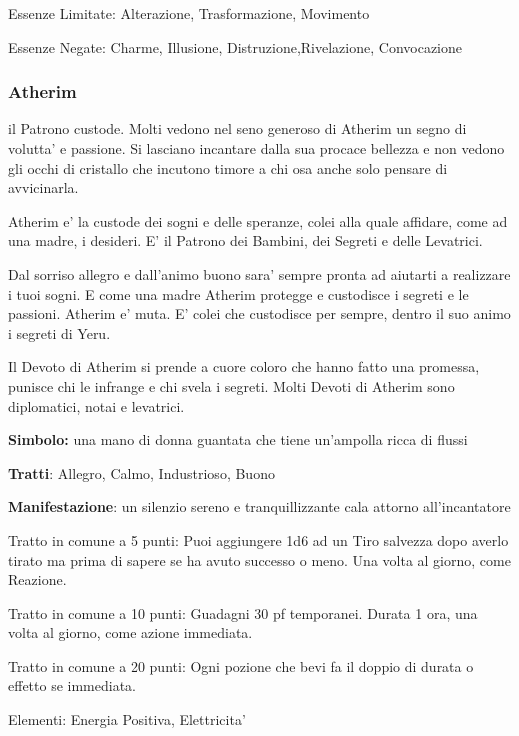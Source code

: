 \documentclass[a4paper,11pt,twoside,openany]{book}
\begin{document}
{Essenze Limitate: Alterazione, Trasformazione, Movimento

Essenze Negate: Charme, Illusione, Distruzione,Rivelazione, Convocazione

\subsubsection{Atherim}

\label{atherim}

il Patrono custode. Molti vedono nel seno generoso di Atherim un segno di volutta' e passione. Si lasciano incantare dalla sua procace bellezza e non vedono gli occhi di cristallo che incutono timore a chi osa anche solo pensare di avvicinarla.

Atherim e' la custode dei sogni e delle speranze, colei alla quale affidare, come ad una madre, i desideri. E' il Patrono dei Bambini, dei Segreti e delle Levatrici.

Dal sorriso allegro e dall'animo buono sara' sempre pronta ad aiutarti a realizzare i tuoi sogni. E come una madre Atherim protegge e custodisce i segreti e le passioni. Atherim e' muta. E' colei che custodisce per sempre, dentro il suo animo i segreti di Yeru.

Il Devoto di Atherim si prende a cuore coloro che hanno fatto una promessa, punisce chi le infrange e chi svela i segreti. Molti Devoti di Atherim sono diplomatici, notai e levatrici.

\textbf{Simbolo:} una mano di donna guantata che tiene un'ampolla ricca di flussi

\textbf{Tratti}: Allegro, Calmo, Industrioso, Buono

\textbf{Manifestazione}: un silenzio sereno e tranquillizzante cala attorno all'incantatore

\bigskip

Tratto in comune a 5 punti: Puoi aggiungere 1d6 ad un Tiro salvezza dopo averlo tirato ma prima di sapere se ha avuto successo o meno. Una volta al giorno, come Reazione.

Tratto in comune a 10 punti: Guadagni 30 pf temporanei. Durata 1 ora, una volta al giorno, come azione immediata.

Tratto in comune a 20 punti: Ogni pozione che bevi fa il doppio di durata o effetto se immediata.

\bigskip

Elementi: Energia Positiva, Elettricita'

\bigskip

}
\end{document}
